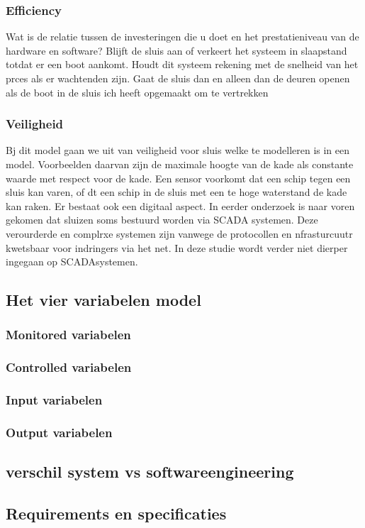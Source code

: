 \documentclass{article}
\begin{document}
\subsubsection{Efficiency} Wat is de relatie tussen de investeringen die u doet en het prestatieniveau van de hardware en software?
Blijft de sluis aan of verkeert het systeem in slaapstand totdat er een boot aankomt.
Houdt dit systeem rekening met de snelheid van het prces als er wachtenden zijn.
Gaat de sluis dan en alleen dan de deuren openen als de boot in de sluis ich heeft opgemaakt om te vertrekken
\subsubsection{Veiligheid} Bj dit model gaan we uit van veiligheid voor sluis welke te modelleren is in een model. Voorbeelden daarvan zijn de maximale hoogte van de kade als constante waarde met respect voor de kade. Een sensor voorkomt dat een schip tegen een sluis kan varen, of dt een schip in de sluis met een te hoge waterstand de kade kan raken. Er bestaat ook een digitaal aspect. In  eerder onderzoek is naar voren gekomen dat sluizen soms bestuurd worden via SCADA systemen. Deze verourderde en  complrxe systemen zijn vanwege de protocollen en nfrasturcuutr kwetsbaar voor indringers via het net. In deze studie wordt verder niet dierper ingegaan op SCADAsystemen.
\subsection{Het vier variabelen model}
\subsubsection{Monitored variabelen}
\subsubsection{Controlled variabelen}
\subsubsection{Input variabelen}
\subsubsection{Output variabelen}
\subsection{verschil system vs softwareengineering}
\subsection{Requirements en specificaties}
\end{document}
